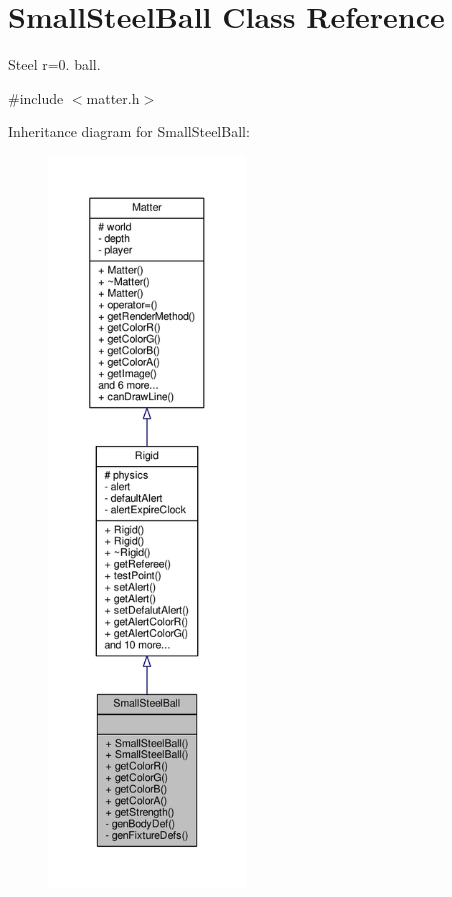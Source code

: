 \hypertarget{classSmallSteelBall}{}\section{Small\+Steel\+Ball Class Reference}
\label{classSmallSteelBall}


Steel r=0. ball.  




{\ttfamily \#include $<$matter.\+h$>$}



Inheritance diagram for Small\+Steel\+Ball\+:
\nopagebreak
\begin{figure}[H]
\begin{center}
\leavevmode
\includegraphics[height=550pt]{classSmallSteelBall__inherit__graph}
\end{center}
\end{figure}


